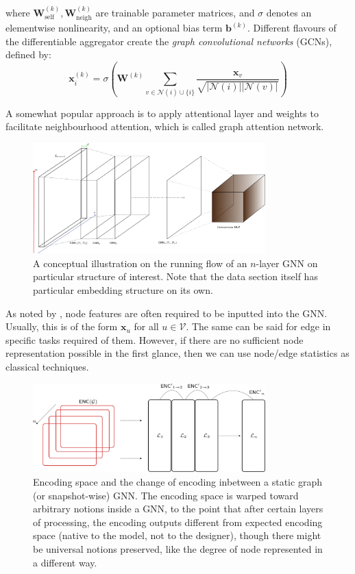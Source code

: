 \documentclass[10pt,oneside,oldfontcommands,dvipsnames,article]{memoir}
\begin{document}
where $\mathbf{W}_{\mathrm{self}}^{(k)}, \mathbf{W}_{\mathrm{neigh}}^{(k)}$ are trainable parameter matrices, and $\sigma$ denotes an elementwise nonlinearity, and an optional bias term $\mathbf{b}^{(k)}$. Different flavours of the differentiable aggregator create the \textit{graph convolutional networks} (GCNs), defined by: 
\begin{equation}
    \mathbf{x}_i^{(k)} = \sigma \left( \mathbf{W}^{(k)} \sum_{v\in \mathcal{N}(i)\cup \{i\}} \frac{\mathbf{x}_{v}}{\sqrt{\lvert \mathcal{N}(i)\rvert \lvert \mathcal{N}(v)\rvert }} \right)
\end{equation}

A somewhat popular approach is to apply attentional layer and weights to facilitate neighbourhood attention, which is called graph attention network.

\begin{figure}[htb]
    \centering
    \includegraphics[width=0.8\textwidth]{img/What.png}
    \caption{A conceptual illustration on the running flow of an $n$-layer GNN on particular structure of interest. Note that the data section itself has particular embedding structure on its own.}
\end{figure}

As noted by \cite{GRP_Hamilton}, node features are often required to be inputted into the GNN. Usually, this is of the form $\mathbf{x}_{u}$ for all $u\in \mathcal{V}$. The same can be said for edge in specific tasks required of them. However, if there are no sufficient node representation possible in the first glance, then we can use node/edge statistics as classical techniques. 

\begin{figure}[htb]
    \centering
    \includegraphics[width=0.8\textwidth]{img/gnn_encoding.png}
    \caption{Encoding space and the change of encoding inbetween a static graph (or snapshot-wise) GNN. The encoding space is warped toward arbitrary notions inside a GNN, to the point that after certain layers of processing, the encoding outputs different from expected encoding space (native to the model, not to the designer), though there might be universal notions preserved, like the degree of node represented in a different way.}
\end{figure}
\end{document}
